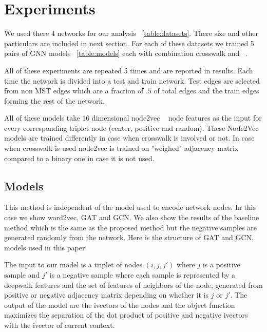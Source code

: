\documentclass[sigconf,authordraft]{acmart}
\begin{document}
\section{Experiments}
We used there 4 networks for our analysis ~\ref{table:datasets}. There size and other particulars are included in next section. For each of these datasets we trained 5 pairs of GNN models ~\ref{table:models} each with combination crosswalk and ~.

All of these experiments are repeated 5 times and are reported in results. Each time the network is divided into a test and train network. Test edges are selected from non MST edges which are a fraction of $.5$ of total edges and the train edges forming the rest of the network.

All of these models take $16$ dimensional node2vec ~\cite{grover_node2vec_2016} node features as the input for every corresponding triplet node (center, positive and random). These Node2Vec models are trained differently in case when crosswalk is involved or not. In case when crosswalk is used node2vec is trained on "weighed" adjacency matrix compared to a binary one in case it is not used.

\subsection{Models}

This method is independent of the model used to encode network nodes. In this case we show word2vec, GAT and GCN. We also show the results of the baseline method which is the same as the proposed method but the negative samples are generated randomly from the network. Here is the structure of GAT and GCN, models used in this paper.

The input to our model is a triplet of nodes $(i,j,j')$ where $j$ is a positive sample and $j'$ is a negative sample where each sample is represented by a deepwalk features and the set of features of neighbors of the node, generated from positive or negative adjacency matrix depending on whether it is $j$ or $j'$. The output of the model are the ivectors of the nodes and the object function maximizes the separation of the dot product of positive and negative ivectors with the ivector of current context.


\end{document}
